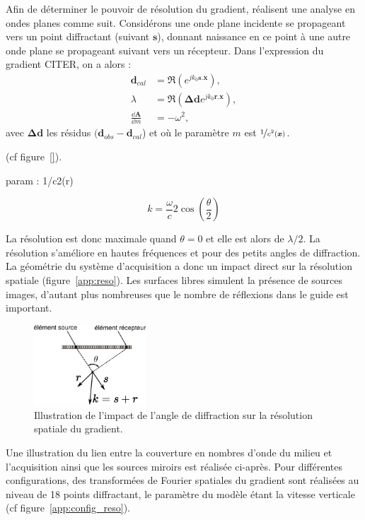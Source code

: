 Afin de déterminer le pouvoir de résolution du gradient, \cite{sirgue} réalisent une analyse en ondes planes comme suit. Considérons une onde plane incidente se propageant vers un point diffractant (suivant $\bm{s}$), donnant naissance en ce point à une autre onde plane se propageant suivant vers un récepteur. Dans l'expression du gradient CITER, on a alors : 
\begin{align}
	\bm{d}_{cal} &= \Re{(e^{jk_{0}\bm{s}.\bm{x}})},\\
	\lambda &= \Re{(\bm{\Delta d} e^{jk_{0}\bm{r}.\bm{x}})},\\
	\frac{\dd \bm{A}}{\dd m} &= -\omega^2,
\end{align}
avec $ \bm{\Delta d}$ les résidus $(\bm{d}_{obs}-\bm{d}_{cal}$) et où le paramètre $m$ est $\nicefrac{1}{c^2(\bm{x})}$.




 (cf figure~\ref{}).

param : 1/c2(r)

\begin{equation}
	k= \frac{\omega}{c} 2 \cos\left( \frac{\theta}{2}\right)
	\label{app:nb_onde}
\end{equation}

La résolution est donc maximale quand $\theta=0$ et elle est alors de $\lambda/2$. La résolution s'améliore en hautes fréquences et pour des petits angles de diffraction. La géométrie du système d'acquisition a donc un impact direct sur la résolution spatiale (figure~\ref{app:reso}). Les surfaces libres simulent la présence de sources images, d'autant plus nombreuses que le nombre de réflexions dans le guide est important. \\

\begin{figure}[!h]
	\centering
	\includegraphics[height=3cm]{img/reso.png}
	\caption{Illustration de l'impact de l'angle de diffraction sur la résolution spatiale du gradient.}
\end{figure}


Une illustration du lien entre la couverture en nombres d'onde du milieu et l'acquisition ainsi que les sources miroirs est réalisée ci-après. Pour différentes configurations, des transformées de Fourier spatiales du gradient sont réalisées au niveau de 18 points diffractant, le paramètre du modèle étant la vitesse verticale (cf figure~\ref{app:config_reso}).

